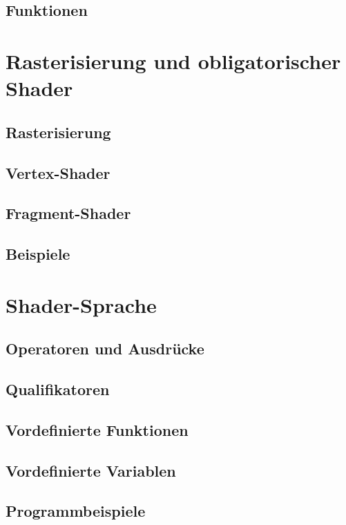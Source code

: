 \subsection{Funktionen}

\section{Rasterisierung und obligatorischer Shader}
\subsection{Rasterisierung}
\subsection{Vertex-Shader}
\subsection{Fragment-Shader}

\subsection{Beispiele}

\section{Shader-Sprache}
\subsection{Operatoren und Ausdrücke}
\subsection{Qualifikatoren}

\subsection{Vordefinierte Funktionen}

\subsection{Vordefinierte Variablen}

\subsection{Programmbeispiele}

